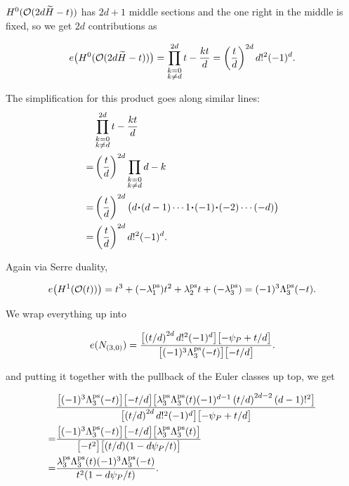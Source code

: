 \documentclass[12pt]{memoir}
\begin{document}
\begin{itemize}
          \(H^0(\mathcal{O}(2d\widetilde{H}-t))\) has \(2d+1\) middle sections and the one right in the middle is fixed, so we get \(2d\) contributions as

          \[e\bigl(H^0(\mathcal{O}(2d\widetilde{H}-t))\bigr)=\prod_{\substack{k=0\\ k\neq d}}^{2d}t-\frac{kt}{d}=\left(\frac{t}{d}\right)^{2d}d!^2(-1)^d.\]

          \begin{ptcb}
              The simplification for this product goes along similar lines:
              \begin{align*}
                    & \prod_{\substack{k=0                                                             \\ k\neq d}}^{2d}t-\frac{kt}{d}\\
                  = & \left(\frac{t}{d}\right)^{2d}\prod_{\substack{k=0                                \\ k\neq d}}d-k\\
                  = & \left(\frac{t}{d}\right)^{2d}\bigl(d\.(d-1)\cdots 1\.(-1)\.(-2)\cdots (-d)\bigr) \\
                  = & \left(\frac{t}{d}\right)^{2d}d!^2(-1)^d.
              \end{align*}
          \end{ptcb}
          Again via Serre duality,

          \[e\bigl(H^1(\mathcal{O}(t))\bigr)=t^3+(-\lambda_1^{\operatorname{\mathrm{ps}}})t^2+\lambda_2^{\operatorname{\mathrm{ps}}}t+(-\lambda_3^{\operatorname{\mathrm{ps}}})=(-1)^3\Lambda_3^{\operatorname{\mathrm{ps}}}(-t).\]

\end{itemize}
We wrap everything up into

\[e(N_{(3,0)})=\frac{\bigl[\left(t/d\right)^{2d}d!^2(-1)^d\bigr]\bigl[-\psi_P+t/d\bigr]}{\bigl[(-1)^3\Lambda_3^{\operatorname{\mathrm{ps}}}(-t)\bigr]\bigl[-t/d\bigr]}.\]

and putting it together with the pullback of the Euler classes up top, we get

\begin{align*}
      & \frac{\bigl[(-1)^3\Lambda_3^{\operatorname{\mathrm{ps}}}(-t)\bigr]\bigl[-t/d\bigr]\bigl[\lambda_3^{\operatorname{\mathrm{ps}}}\Lambda_3^{\operatorname{\mathrm{ps}}}(t)(-1)^{d-1}\left(t/d\right)^{2d-2}(d-1)!^2\bigr]}{\bigl[\left(t/d\right)^{2d}d!^2(-1)^d\bigr]\bigl[-\psi_P+t/d\bigr]} \\
    = & \frac{\bigl[(-1)^3\Lambda_3^{\operatorname{\mathrm{ps}}}(-t)\bigr]\bigl[-t/d\bigr]\bigl[\lambda_3^{\operatorname{\mathrm{ps}}}\Lambda_3^{\operatorname{\mathrm{ps}}}(t)\bigr]}{\bigl[-t^2\bigr]\bigl[(t/d)(1-d\psi_P/t)\bigr]}                                                              \\
    = & \frac{\lambda_3^{\operatorname{\mathrm{ps}}}\Lambda_3^{\operatorname{\mathrm{ps}}}(t)(-1)^3\Lambda_3^{\operatorname{\mathrm{ps}}}(-t)}{t^2(1-d\psi_P/t)}.
\end{align*}
\end{document}
